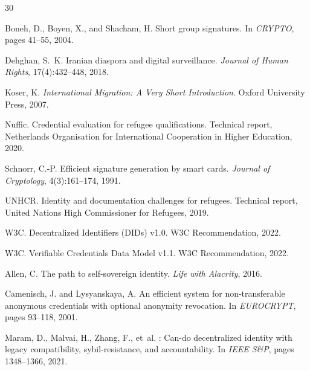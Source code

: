 \documentclass[11pt,a4paper]{article}
\begin{document}


\begin{thebibliography}{30}

Boneh, D., Boyen, X., and Shacham, H.
\newblock Short group signatures.
\newblock In \emph{CRYPTO}, pages 41--55, 2004.

Dehghan, S.~K.
\newblock Iranian diaspora and digital surveillance.
\newblock \emph{Journal of Human Rights}, 17(4):432--448, 2018.

Koser, K.
\newblock \emph{International Migration: A Very Short Introduction}.
\newblock Oxford University Press, 2007.

Nuffic.
\newblock Credential evaluation for refugee qualifications.
\newblock Technical report, Netherlands Organisation for International Cooperation in Higher Education, 2020.

Schnorr, C.-P.
\newblock Efficient signature generation by smart cards.
\newblock \emph{Journal of Cryptology}, 4(3):161--174, 1991.

UNHCR.
\newblock Identity and documentation challenges for refugees.
\newblock Technical report, United Nations High Commissioner for Refugees, 2019.

W3C.
\newblock Decentralized Identifiers ({DIDs}) v1.0.
\newblock W3C Recommendation, 2022.

W3C.
\newblock Verifiable Credentials Data Model v1.1.
\newblock W3C Recommendation, 2022.

Allen, C.
\newblock The path to self-sovereign identity.
\newblock \emph{Life with Alacrity}, 2016.

Camenisch, J. and Lysyanskaya, A.
\newblock An efficient system for non-transferable anonymous credentials with optional anonymity revocation.
\newblock In \emph{EUROCRYPT}, pages 93--118, 2001.

Maram, D., Malvai, H., Zhang, F., et~al.
: Can-do decentralized identity with legacy compatibility, sybil-resistance, and accountability.
\newblock In \emph{IEEE S\&P}, pages 1348--1366, 2021.


\end{thebibliography}
\end{document}
